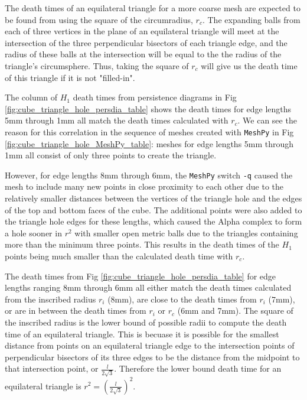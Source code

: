 \documentclass[ma]{uncgdissertationexp}
\theoremstyle{plain}
\theoremstyle{definition}
\theoremstyle{remark}
\begin{document}
\par The death times of an equilateral triangle for a more coarse mesh are expected to be found from using the square of the circumradius, $r_{c}$. The expanding balls from each of three vertices in the plane of an equilateral triangle will meet at the intersection of the three perpendicular bisectors of each triangle edge, and the radius of these balls at the intersection will be equal to the the radius of the triangle's circumsphere. Thus, taking the square of $r_{c}$ will give us the death time of this triangle if it is not "filled-in".
\par The column of $H_{1}$ death times from persistence diagrams in Fig \ref{fig:cube_triangle_hole_persdia_table} shows the death times for edge lengths 5mm through 1mm all match the death times calculated with $r_{c}$. We can see the reason for this correlation in the sequence of meshes created with \verb"MeshPy" in Fig \ref{fig:cube_triangle_hole_MeshPy_table}: meshes for edge lengths 5mm through 1mm all consist of only three points to create the triangle.
\par However, for edge lengths 8mm through 6mm, the \verb"MeshPy" switch \verb"-q" caused the mesh to include many new points in close proximity to each other due to the relatively smaller distances between the vertices of the triangle hole and the edges of the top and bottom faces of the cube. The additional points were also added to the triangle hole edges for these lengths, which caused the Alpha complex to form a hole sooner in $r^{2}$ with smaller open metric balls due to the triangles containing more than the minimum three points. This results in the death times of the $H_{1}$ points being much smaller than the calculated death time with $r_{c}$.
\par The death times from Fig \ref{fig:cube_triangle_hole_persdia_table} for edge lengths ranging 8mm through 6mm all either match the death times calculated from the inscribed radius $r_{i}$ (8mm), are close to the death times from $r_{i}$ (7mm), or are in between the death times from $r_{i}$ or $r_{c}$ (6mm and 7mm). The square of the inscribed radius is the lower bound of possible radii to compute the death time of an equilateral triangle. This is becuase it is possible for the smallest  distance from points on an equilateral triangle edge to the intersection points of perpendicular bisectors of its three edges to be the distance from the midpoint to that intersection point, or $\frac{l}{2\sqrt{3}}$. Therefore the lower bound death time for an equilateral triangle is $r^{2}=(\frac{l}{2\sqrt{3}})^{2}$.
\end{document}
